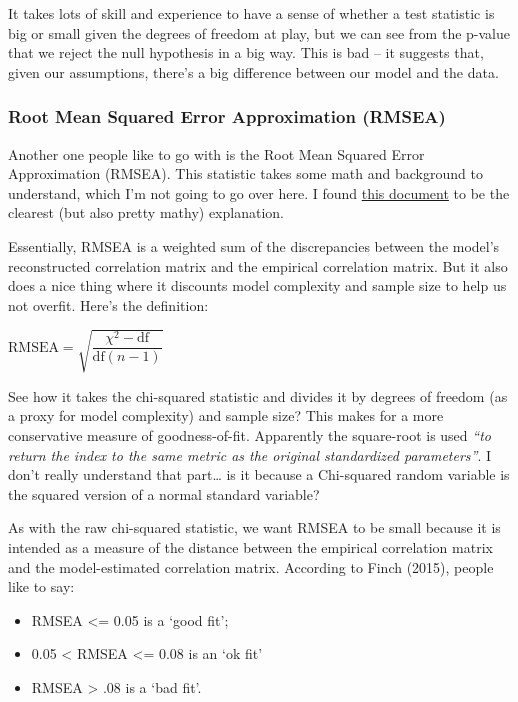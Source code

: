 \documentclass[
  letterpaper,
  DIV=11,
  numbers=noendperiod]{scrreprt}
\begin{document}
It takes lots of skill and experience to have a sense of whether a test
statistic is big or small given the degrees of freedom at play, but we
can see from the p-value that we reject the null hypothesis in a big
way. This is bad -- it suggests that, given our assumptions, there's a
big difference between our model and the data.

\hypertarget{root-mean-squared-error-approximation-rmsea}{%
\subsubsection*{Root Mean Squared Error Approximation
(RMSEA)}\label{root-mean-squared-error-approximation-rmsea}}

Another one people like to go with is the Root Mean Squared Error
Approximation (RMSEA). This statistic takes some math and background to
understand, which I'm not going to go over here. I found
\href{http://www.statpower.net/Content/312/Handout/Measures\%20of\%20Fit\%20in\%20Structural\%20Equation\%20Modeling.pdf}{this
document} to be the clearest (but also pretty mathy) explanation.

Essentially, RMSEA is a weighted sum of the discrepancies between the
model's reconstructed correlation matrix and the empirical correlation
matrix. But it also does a nice thing where it discounts model
complexity and sample size to help us not overfit. Here's the
definition:

\(\text{RMSEA} = \sqrt{\dfrac{χ^2 - \text{df}}{\text{df}(n-1)}}\)

See how it takes the chi-squared statistic and divides it by degrees of
freedom (as a proxy for model complexity) and sample size? This makes
for a more conservative measure of goodness-of-fit. Apparently the
square-root is used \emph{``to return the index to the same metric as
the original standardized parameters''}. I don't really understand that
part\ldots{} is it because a Chi-squared random variable is the squared
version of a normal standard variable?

As with the raw chi-squared statistic, we want RMSEA to be small because
it is intended as a measure of the distance between the empirical
correlation matrix and the model-estimated correlation matrix. According
to Finch (2015), people like to say:

\begin{itemize}
\item
  RMSEA \textless= 0.05 is a `good fit';
\item
  0.05 \textless{} RMSEA \textless= 0.08 is an `ok fit'
\item
  RMSEA \textgreater{} .08 is a `bad fit'.
\end{itemize}
\end{document}
